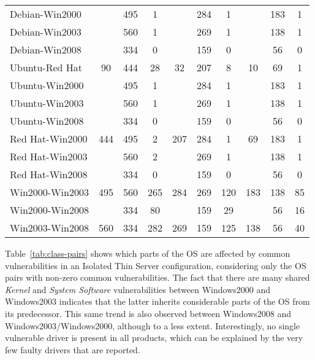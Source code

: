 \begin{table*}[!ht]
\begin{center}
{\begin{tabular}{|l|| c c c| c c c| c c c| }
Debian-Win2000 & & 495 & 1 & & 284 & 1 & & 183 & 1\\
Debian-Win2003 & & 560 & 1 & & 269 & 1 & & 138 & 1\\
Debian-Win2008 & & 334 & 0 & & 159 & 0 & & 56 & 0\\ \hline
Ubuntu-Red Hat & 90 & 444 & 28 & 32 & 207 & 8 & 10 & 69 & 1\\
Ubuntu-Win2000 & & 495 & 1 & & 284 & 1 & & 183 & 1\\
Ubuntu-Win2003 & & 560 & 1 & & 269 & 1 & & 138 & 1\\
Ubuntu-Win2008 & & 334 & 0 & & 159 & 0 & & 56 & 0\\ \hline
Red Hat-Win2000 & 444 & 495 & 2 & 207 & 284 & 1 & 69 & 183 & 1\\
Red Hat-Win2003 & & 560 & 2 & & 269 & 1 & & 138 & 1\\
Red Hat-Win2008 & & 334 & 0 & & 159 & 0 & & 56 & 0\\  \hline
Win2000-Win2003 & 495 & 560 & 265 & 284 & 269 & 120 & 183 & 138 & 85\\
Win2000-Win2008 & & 334 & 80 & & 159 & 29 & & 56 & 16\\  \hline
Win2003-Win2008 & 560 & 334 & 282 & 269 & 159 & 125 & 138 & 56 & 40\\ \hline
\end{tabular}
}
\end{center}
\end{table*}



Table~\ref{tab:class-pairs} shows which parts of the OS are affected by common vulnerabilities in an Isolated Thin Server configuration, considering only the OS pairs with non-zero common vulnerabilities. The fact that there are many shared \textit{Kernel} and \textit{System Software} vulnerabilities between Windows2000 and Windows2003 indicates that the latter inherits considerable parts of the OS from its predecessor. This same trend is also observed between Windows2008 and Windows2003/Windows2000, although to a less extent. Interestingly, no single vulnerable driver is present in all products, which can be explained by the very few faulty drivers that are reported.

